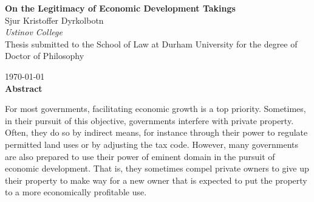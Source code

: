 




\begin{quoting}
  \singlespace
    \begin{center}
  {\LARGE \bfseries  On the Legitimacy of Economic Development Takings }\\
  \vspace*{0.5cm}
      {\large Sjur Kristoffer Dyrkolbotn}\\
  \vspace*{0.1cm}  
      {\large \emph{Ustinov College}}\\
  \vspace*{0.2cm}  
    {\normalsize Thesis submitted to the School of Law at Durham University for the degree of Doctor of Philosophy}

  \vspace*{0.2cm}  
    {\normalsize \today}\\
  \vspace*{0.5cm}  
    {\normalsize \bfseries Abstract}      
  \end{center}
  {\parindent0pt
For most governments, facilitating economic growth is a top priority. Sometimes, in their pursuit of this objective, governments interfere with private property. Often, they do so by indirect means, for instance through their power to regulate permitted land uses or by adjusting the tax code. However, many governments are also prepared to use their power of eminent domain in the pursuit of economic development. That is, they sometimes compel private owners to give up their property to make way for a new owner that is expected to put the property to a more economically profitable use. %
}
\vspace{0.7mm}


\end{quoting}
